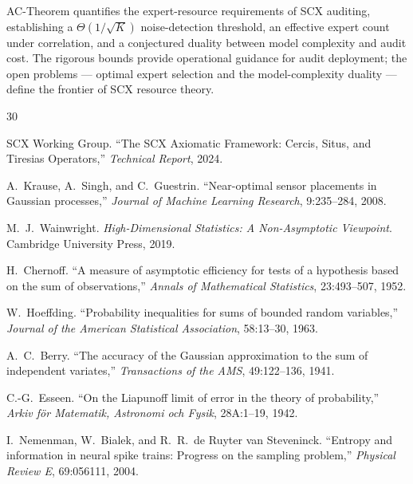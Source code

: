\documentclass[12pt,a4paper]{article}
\begin{document}
AC-Theorem quantifies the expert-resource requirements of SCX auditing,
establishing a $\Theta(1/\sqrt{K})$ noise-detection threshold, an effective
expert count under correlation, and a conjectured duality between model
complexity and audit cost.  The rigorous bounds provide operational guidance
for audit deployment; the open problems — optimal expert selection and the
model-complexity duality — define the frontier of SCX resource theory.


\begin{thebibliography}{30}

SCX Working Group.
\newblock ``The SCX Axiomatic Framework: Cercis, Situs, and Tiresias
Operators,''
\newblock \emph{Technical Report}, 2024.

A.~Krause, A.~Singh, and C.~Guestrin.
\newblock ``Near-optimal sensor placements in Gaussian processes,''
\newblock \emph{Journal of Machine Learning Research}, 9:235--284, 2008.

M.~J.~Wainwright.
\newblock \emph{High-Dimensional Statistics: A Non-Asymptotic Viewpoint}.
\newblock Cambridge University Press, 2019.

H.~Chernoff.
\newblock ``A measure of asymptotic efficiency for tests of a hypothesis
based on the sum of observations,''
\newblock \emph{Annals of Mathematical Statistics}, 23:493--507, 1952.

W.~Hoeffding.
\newblock ``Probability inequalities for sums of bounded random variables,''
\newblock \emph{Journal of the American Statistical Association},
58:13--30, 1963.

A.~C.~Berry.
\newblock ``The accuracy of the Gaussian approximation to the sum of
independent variates,''
\newblock \emph{Transactions of the AMS}, 49:122--136, 1941.

C.-G.~Esseen.
\newblock ``On the Liapunoff limit of error in the theory of probability,''
\newblock \emph{Arkiv f\"or Matematik, Astronomi och Fysik}, 28A:1--19, 1942.

I.~Nemenman, W.~Bialek, and R.~R.~de Ruyter van Steveninck.
\newblock ``Entropy and information in neural spike trains: Progress on the
sampling problem,''
\newblock \emph{Physical Review E}, 69:056111, 2004.


\end{thebibliography}
\end{document}
